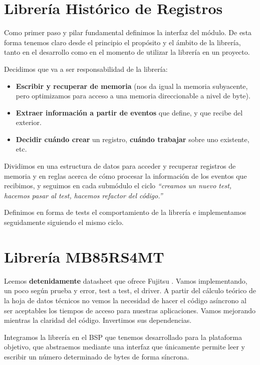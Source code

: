\section{Librería Histórico de Registros}

Como primer paso y pilar fundamental definimos la interfaz del
módulo. De esta forma tenemos claro desde el principio el propósito
y el ámbito de la librería, tanto en el desarrollo como en el momento
de utilizar la librería en un proyecto.

Decidimos que va a ser responsabilidad de la librería:
\begin{itemize}[noitemsep,nolistsep]
    \item \textbf{Escribir y recuperar de memoria} (nos da igual
          la memoria subyacente, pero optimizamos para acceso a una
          memoria direccionable a nivel de byte).
    \item \textbf{Extraer información a partir de eventos} que define, y que
          recibe del exterior.
    \item \textbf{Decidir cuándo crear} un registro, \textbf{cuándo trabajar} sobre
          uno existente, etc.
\end{itemize}

Dividimos en una estructura de datos para acceder y recuperar registros de memoria
y en reglas acerca de cómo procesar la información de los eventos que recibimos,
y seguimos en cada submódulo el ciclo \textit{``creamos un nuevo test, hacemos pasar
al test, hacemos refactor del código.''} \cite{TDD}

Definimos en forma de tests el comportamiento de la librería e implementamos
seguidamente siguiendo el mismo ciclo.

\section{Librería MB85RS4MT}

Leemos \textbf{detenidamente} datasheet que ofrece Fujitsu \cite{Fujitsu:MB85RS4MT}.
Vamos implementando, un poco según prueba y error, test a test, el driver.
A partir del cálculo teórico de la hoja de datos técnicos no vemos la
necesidad de hacer el código asíncrono al ser aceptables los tiempos de acceso para
nuestras aplicaciones.
Vamos mejorando mientras la claridad del código. Invertimos sus dependencias. 

Integramos la librería en el BSP que tenemos desarrollado para la plataforma objetivo,
que abstraemos mediante una interfaz que únicamente permite leer y escribir un
número determinado de bytes de forma síncrona.

